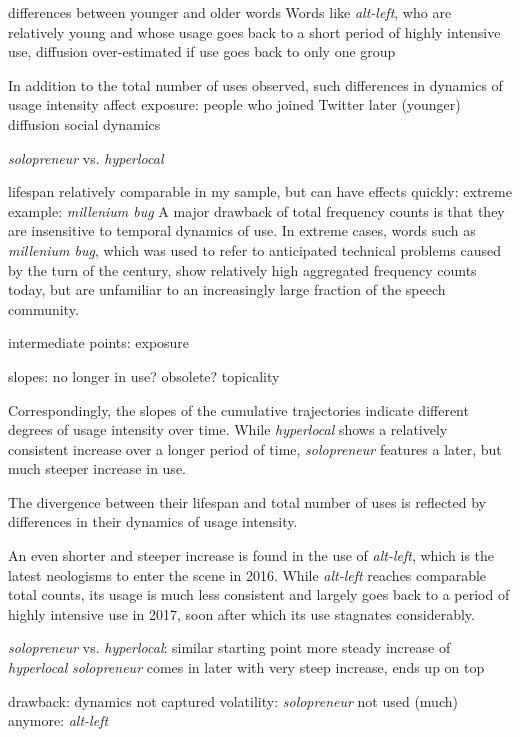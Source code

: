 \documentclass[
  a4paper,
  abstract=on,
  captions=tableabove
  ]{scrartcl}
\begin{document}

    differences between younger and older words
    Words like \emph{alt-left}, who are relatively young and whose usage goes back to a short period of highly intensive use,
      diffusion over-estimated
        if use goes back to only one group
       
  In addition to the total number of uses observed, such differences in dynamics of usage intensity
      affect
        exposure: people who joined Twitter later (younger)
        diffusion
        social dynamics

    \emph{solopreneur} vs. \emph{hyperlocal}

    lifespan
      relatively comparable in my sample, but can have effects quickly:
      extreme example: \emph{millenium bug}
        A major drawback of total frequency counts is that they are insensitive to temporal dynamics of use. In extreme cases, words such as \emph{millenium bug}, which was used to refer to anticipated technical problems caused by the turn of the century, show relatively high aggregated frequency counts today, but are unfamiliar to an increasingly large fraction of the speech community.


intermediate points: exposure


slopes:
  no longer in use? obsolete?
  topicality

    Correspondingly, the slopes of the cumulative trajectories indicate different degrees of usage intensity over time. While \emph{hyperlocal} shows a relatively consistent increase over a longer period of time, \emph{solopreneur} features a later, but much steeper increase in use.

    The divergence between their lifespan and total number of uses is reflected by differences in their dynamics of usage intensity.

    An even shorter and steeper increase is found in the use of \emph{alt-left}, which is the latest neologisms to enter the scene in 2016. While \emph{alt-left} reaches comparable total counts, its usage is much less consistent and largely goes back to a period of highly intensive use in 2017, soon after which its use stagnates considerably.

    \emph{solopreneur} vs. \emph{hyperlocal}:
      similar starting point
      more steady increase of \emph{hyperlocal}
      \emph{solopreneur} comes in later with very steep increase, ends up on top

  drawback: dynamics not captured
    volatility: \emph{solopreneur}
    not used (much) anymore: \emph{alt-left}
\end{document}

